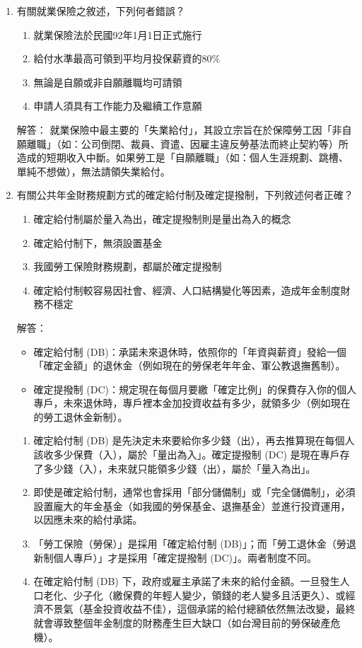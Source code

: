 \documentclass[12pt, a4paper]{article}
\begin{document}
\begin{enumerate}
    \newpage

    \item 有關就業保險之敘述，下列何者錯誤？
    \begin{enumerate}[label=\Alph*.]
        \item 就業保險法於民國92年1月1日正式施行
        \item 給付水準最高可領到平均月投保薪資的80\%
        \item 無論是自願或非自願離職均可請領
        \item 申請人須具有工作能力及繼續工作意願
    \end{enumerate}
    解答：
    就業保險中最主要的「失業給付」，其設立宗旨在於保障勞工因「非自願離職」（如：公司倒閉、裁員、資遣、因雇主違反勞基法而終止契約等）所造成的短期收入中斷。如果勞工是「自願離職」（如：個人生涯規劃、跳槽、單純不想做），無法請領失業給付。

    \item 有關公共年金財務規劃方式的確定給付制及確定提撥制，下列敘述何者正確？
    \begin{enumerate}[label=\Alph*.]
        \item 確定給付制屬於量入為出，確定提撥制則是量出為入的概念
        \item 確定給付制下，無須設置基金
        \item 我國勞工保險財務規劃，都屬於確定提撥制
        \item 確定給付制較容易因社會、經濟、人口結構變化等因素，造成年金制度財務不穩定
    \end{enumerate}
    解答：
    \begin{itemize}
        \item 確定給付制 (DB)：承諾未來退休時，依照你的「年資與薪資」發給一個「確定金額」的退休金（例如現在的勞保老年年金、軍公教退撫舊制）。
        \item 確定提撥制 (DC)：規定現在每個月要繳「確定比例」的保費存入你的個人專戶，未來退休時，專戶裡本金加投資收益有多少，就領多少（例如現在的勞工退休金新制）。
    \end{itemize}
    \begin{enumerate}[label=\Alph*.]
        \item 確定給付制 (DB) 是先決定未來要給你多少錢（出），再去推算現在每個人該收多少保費（入），屬於「量出為入」。確定提撥制 (DC) 是現在專戶存了多少錢（入），未來就只能領多少錢（出），屬於「量入為出」。
        \item 即使是確定給付制，通常也會採用「部分儲備制」或「完全儲備制」，必須設置龐大的年金基金（如我國的勞保基金、退撫基金）並進行投資運用，以因應未來的給付承諾。
        \item 「勞工保險（勞保）」是採用「確定給付制 (DB)」；而「勞工退休金（勞退新制個人專戶）」才是採用「確定提撥制 (DC)」。兩者制度不同。
        \item 在確定給付制 (DB) 下，政府或雇主承諾了未來的給付金額。一旦發生人口老化、少子化（繳保費的年輕人變少，領錢的老人變多且活更久）、或經濟不景氣（基金投資收益不佳），這個承諾的給付總額依然無法改變，最終就會導致整個年金制度的財務產生巨大缺口（如台灣目前的勞保破產危機）。
    \end{enumerate}



\end{enumerate}
\end{document}
